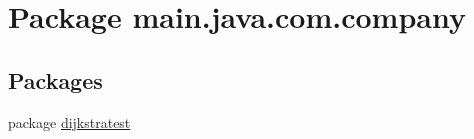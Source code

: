 \hypertarget{namespacemain_1_1java_1_1com_1_1company}{\section{Package main.\-java.\-com.\-company}
\label{namespacemain_1_1java_1_1com_1_1company}
}
\subsection*{Packages}
\begin{DoxyCompactItemize}
\item 
package \hyperlink{namespacemain_1_1java_1_1com_1_1company_1_1dijkstratest}{dijkstratest}
\end{DoxyCompactItemize}
